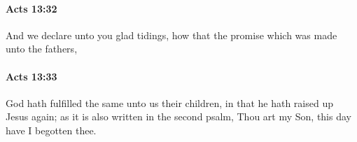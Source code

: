 		\paragraph{Acts 13:32} %
			\label{ACTS-13-32}

			And we declare unto you glad tidings, how that the promise which was made unto the fathers,

			\begin{framed}
			\scriptsize
				\begin{compactdesc}
					\item[SBLG] 
				\end{compactdesc}
			\end{framed}

		\paragraph{Acts 13:33} %
			\label{ACTS-13-33}

			God hath fulfilled the same unto us their children, in that he hath raised up Jesus again; as it is also written in the second psalm, Thou art my Son, this day have I begotten thee.

